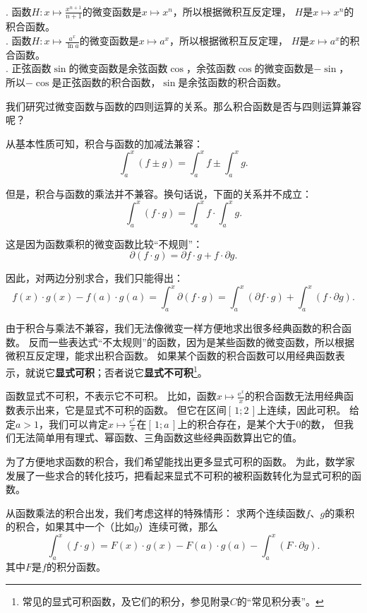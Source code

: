 \documentclass[12pt,UTF8]{ctexbook}
\begin{document}
\begin{so}
    \mbox{} \\
    . 函数$H: x\mapsto \frac{x^{n+1}}{n+1}$的微变函数是$x\mapsto x^n$，所以根据微积互反定理，
    $H$是$x\mapsto x^n$的积合函数。\\
    . 函数$H: x\mapsto \frac{a^x}{\ln{a}}$的微变函数是$x\mapsto a^x$，所以根据微积互反定理，
    $H$是$x\mapsto a^x$的积合函数。\\
    . 正弦函数$\sin$的微变函数是余弦函数$\cos$，余弦函数$\cos$的微变函数是$-\sin$，
    所以$-\cos$是正弦函数的积合函数，$\sin$是余弦函数的积合函数。
\end{so}

我们研究过微变函数与函数的四则运算的关系。那么积合函数是否与四则运算兼容呢？

从基本性质可知，积合与函数的加减法兼容：
$$ \int_a^x (f \pm g) = \int_a^x f \pm \int_a^x g. $$

但是，积合与函数的乘法并不兼容。换句话说，下面的关系并不成立：
$$ \int_a^x (f \cdot g) = \int_a^x f \cdot \int_a^x g. $$

这是因为函数乘积的微变函数比较“不规则”：
$$ \partial (f\cdot g) = \partial f \cdot g + f \cdot \partial g.$$

因此，对两边分别求合，我们只能得出：
$$ f(x)\cdot g(x) - f(a)\cdot g(a) = \int_a^x \partial (f\cdot g) = \int_a^x (\partial f \cdot g) + \int_a^x (f \cdot \partial g). $$

由于积合与乘法不兼容，我们无法像微变一样方便地求出很多经典函数的积合函数。
反而一些表达式“不太规则”的函数，因为是某些函数的微变函数，所以根据微积互反定理，能求出积合函数。
如果某个函数的积合函数可以用经典函数表示，就说它\textbf{显式可积}；否者说它\textbf{显式不可积}\footnote{常见的显式可积函数，及它们的积分，参见附录$C$的“常见积分表”。}。

函数显式不可积，不表示它不可积。
比如，函数$x\mapsto \frac{\mathrm{e}^x}{x}$的积合函数无法用经典函数表示出来，它是显式不可积的函数。
但它在区间$[\,1;2\,]$上连续，因此可积。
给定$a>1$，我们可以肯定$x\mapsto \frac{\mathrm{e}^x}{x}$在$[\,1; a\,]$上的积合存在，是某个大于$0$的数，
但我们无法简单用有理式、幂函数、三角函数这些经典函数算出它的值。

为了方便地求函数的积合，我们希望能找出更多显式可积的函数。
为此，数学家发展了一些求合的转化技巧，把看起来显式不可积的被积函数转化为显式可积的函数。

从函数乘法的积合出发，我们考虑这样的特殊情形：
求两个连续函数$f$、$g$的乘积的积合，如果其中一个（比如$g$）连续可微，那么
$$ \int_a^x (f \cdot g) = F(x)\cdot g(x) - F(a)\cdot g(a) - \int_a^x (F \cdot \partial g). $$
其中$F$是$f$的积分函数。
\end{document}

